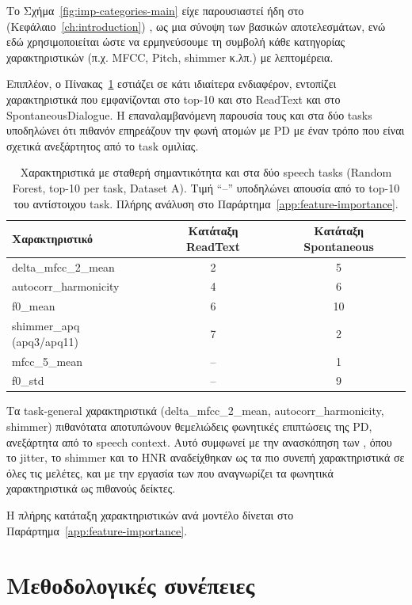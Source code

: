 Το Σχήμα~\ref{fig:imp-categories-main} είχε παρουσιαστεί ήδη στο (Κεφάλαιο~\ref{ch:introduction}) , ως μια σύνοψη των βασικών αποτελεσμάτων, 
ενώ εδώ χρησιμοποιείται ώστε να ερμηνεύσουμε τη συμβολή κάθε κατηγορίας χαρακτηριστικών (π.χ. MFCC, Pitch, \gls{shimmer} κ.λπ.) με λεπτομέρεια. 

Επιπλέον, ο Πίνακας~\ref{tab:cross-task-main} εστιάζει σε κάτι ιδιαίτερα ενδιαφέρον, εντοπίζει χαρακτηριστικά που εμφανίζονται στο top-10 και στο ReadText και στο SpontaneousDialogue.
Η επαναλαμβανόμενη παρουσία τους και στα δύο tasks υποδηλώνει ότι πιθανόν επηρεάζουν την φωνή ατομών με PD με έναν τρόπο που είναι σχετικά ανεξάρτητος από το task ομιλίας.

\begin{table}[H]
\centering
\caption{Χαρακτηριστικά με σταθερή σημαντικότητα και στα δύο speech tasks (Random Forest, top-10 per task, Dataset A). Τιμή ``--'' υποδηλώνει απουσία από το top-10 του αντίστοιχου task. Πλήρης ανάλυση στο Παράρτημα~\ref{app:feature-importance}.}
\label{tab:cross-task-main}
\begin{tabular}{@{}lcc@{}}
\toprule
\textbf{Χαρακτηριστικό} & \textbf{Κατάταξη ReadText} & \textbf{Κατάταξη Spontaneous} \\
\midrule
delta\_mfcc\_2\_mean & 2 & 5 \\
autocorr\_harmonicity & 4 & 6 \\
f0\_mean & 6 & 10 \\
shimmer\_apq (apq3/apq11) & 7 & 2 \\
mfcc\_5\_mean & -- & 1 \\
f0\_std & -- & 9 \\
\bottomrule
\end{tabular}
\end{table}

Τα task-general χαρακτηριστικά (delta\_mfcc\_2\_mean, autocorr\_harmonicity, \gls{shimmer}) πιθανότατα αποτυπώνουν θεμελιώδεις φωνητικές επιπτώσεις της PD, ανεξάρτητα από το speech context. 
Αυτό συμφωνεί με την ανασκόπηση των \citet{wright2025vocal}, όπου το \gls{jitter}, το \gls{shimmer} και το HNR αναδείχθηκαν ως τα πιο συνεπή χαρακτηριστικά σε όλες τις μελέτες, και με την εργασία των \citet{cao2025speech} που αναγνωρίζει τα φωνητικά χαρακτηριστικά ως πιθανούς δείκτες. 

Η πλήρης κατάταξη χαρακτηριστικών ανά μοντέλο δίνεται στο Παράρτημα~\ref{app:feature-importance}.

\section{Μεθοδολογικές συνέπειες}

